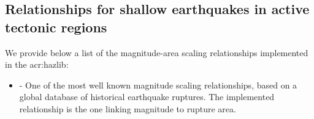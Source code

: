 \subsection{Relationships for shallow earthquakes in active tectonic regions}

We provide below a list of the magnitude-area scaling relationships
implemented in the \gls{acr:hazlib}:

\begin{itemize}

    \item \cite{wells1994} - One of the most well known magnitude scaling
	relationships, based on a global database of historical earthquake
	ruptures. The implemented relationship is the one linking magnitude to
	rupture area.

\end{itemize}


%
%
